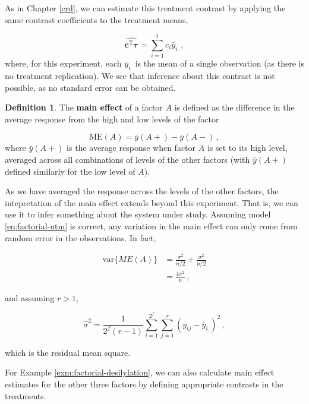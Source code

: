 \documentclass[
]{book}
\theoremstyle{definition}
\newtheorem{definition}{Definition}[chapter]
\theoremstyle{definition}
\theoremstyle{definition}
\theoremstyle{definition}
\theoremstyle{remark}
\begin{document}
As in Chapter \ref{crd}, we can estimate this treatment contrast by applying the same contrast coefficients to the treatment means,

\[
\widehat{\boldsymbol{c}^{\mathrm{T}}\boldsymbol{\tau}} = \sum_{i=1}^tc_i\bar{y}_{i.}\,,
\]
where, for this experiment, each \(\bar{y}_{i.}\) is the mean of a single observation (as there is no treatment replication). We see that inference about this contrast is not possible, as no standard error can be obtained.

\begin{definition}
\protect\hypertarget{def:main-effect}{}\label{def:main-effect}The \textbf{main effect} of a factor \(A\) is defined as the difference in the average response from the high and low levels of the factor

\[
\mbox{ME}(A) = \bar{y}(A+) - \bar{y}(A-)\,,
\]
where \(\bar{y}(A+)\) is the average response when factor \(A\) is set to its high level, averaged across all combinations of levels of the other factors (with \(\bar{y}(A+)\) defined similarly for the low level of \(A\)).
\end{definition}

As we have averaged the response across the levels of the other factors, the intepretation of the main effect extends beyond this experiment. That is, we can use it to infer something about the system under study. Assuming model \eqref{eq:factorial-utm} is correct, any variation in the main effect can only come from random error in the observations. In fact,

\begin{align*}
\mbox{var}\{ME(A)\} & = \frac{\sigma^2}{n/2} + \frac{\sigma^2}{n/2} \\
& = \frac{4\sigma^2}{n}\,,
\end{align*}

and assuming \(r>1\),

\begin{equation}
\hat{\sigma}^2 = \frac{1}{2^f(r-1)} \sum_{i=1}^{2^f}\sum_{j=1}^r(y_{ij} - \bar{y}_{i.})^2\,,
\label{eq:factorial-sigma-hat-2}
\end{equation}

which is the residual mean square.

For Example \ref{exm:factorial-desilylation}, we can also calculate main effect estimates for the other three factors by defining appropriate contrasts in the treatments.
\end{document}
